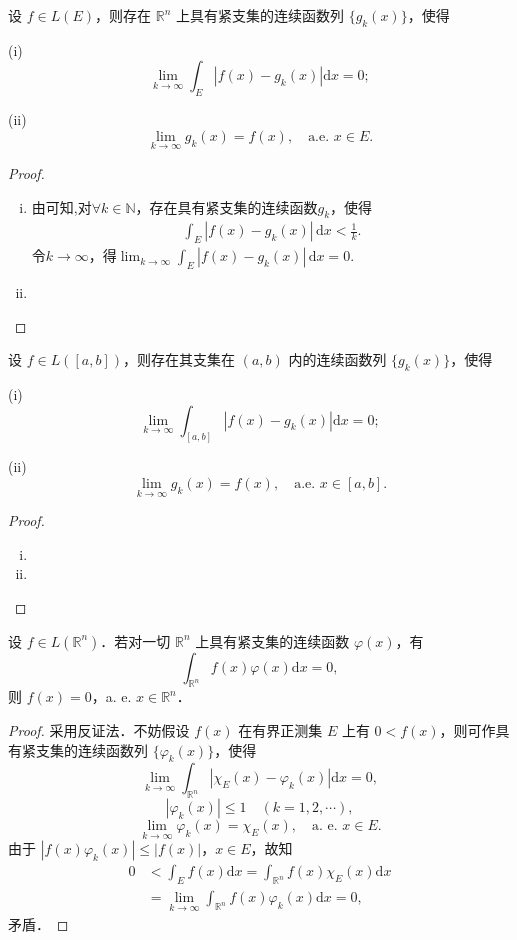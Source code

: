 \documentclass[../../main.tex]{subfiles}
\begin{document}
\begin{corollary}
设 \( f \in L(E) \)，则存在 \( \mathbb{R}^n \) 上具有紧支集的连续函数列 \( \{ g_k(x) \} \)，使得

(i)
\[
\lim_{k \to \infty} \int_E |f(x) - g_k(x)| \mathrm{d}x = 0;
\]

(ii)
\[
\lim_{k \to \infty} g_k(x) = f(x), \quad \text{a.e. } x \in E.
\]
\end{corollary}
\begin{proof}
\begin{enumerate}[(i)]
\item 由可知,对\(\forall k \in \mathbb{N}\)，存在具有紧支集的连续函数\(g_k\)，使得
\begin{align*}
\int_E \left| f(x) - g_k(x) \right| \, \mathrm{d}x < \frac{1}{k}.
\end{align*}
令\(k \to \infty\)，得\(\lim_{k \to \infty} \int_E \left| f(x) - g_k(x) \right| \, \mathrm{d}x = 0\).

\item 
\end{enumerate}
\end{proof}

\begin{corollary}
设 \( f \in L([a,b]) \)，则存在其支集在 \( (a,b) \) 内的连续函数列 \( \{ g_k(x) \} \)，使得

(i)
\[
\lim_{k \to \infty} \int_{[a,b]} |f(x) - g_k(x)| \mathrm{d}x = 0;
\]

(ii)
\[
\lim_{k \to \infty} g_k(x) = f(x), \quad \text{a.e. } x \in [a,b].
\]
\end{corollary}
\begin{proof}
\begin{enumerate}[(i)]
\item 

\item 
\end{enumerate}
\end{proof}

\begin{example}
设 \( f \in L(\mathbb{R}^n) \)．若对一切 \( \mathbb{R}^n \) 上具有紧支集的连续函数 \( \varphi(x) \)，有
\[
\int_{\mathbb{R}^n} f(x)\varphi(x) \mathrm{d}x = 0,
\]
则 \( f(x) = 0 \)，a. e. \( x \in \mathbb{R}^n \)．
\end{example}
\begin{proof}
采用反证法．不妨假设 \( f(x) \) 在有界正测集 \( E \) 上有 \( 0 < f(x) \)，则可作具有紧支集的连续函数列 \( \{ \varphi_k(x) \} \)，使得
\[
\lim_{k \to \infty} \int_{\mathbb{R}^n} |\chi_E(x) - \varphi_k(x)| \mathrm{d}x = 0,
\]
\[
|\varphi_k(x)| \leqslant 1 \quad (k = 1,2,\cdots),
\]
\[
\lim_{k \to \infty} \varphi_k(x) = \chi_E(x), \quad \text{a. e. } x \in E.
\]
由于 \( |f(x)\varphi_k(x)| \leqslant |f(x)| \)，\( x \in E \)，故知
\begin{align*}
0 &< \int_E f(x) \mathrm{d}x = \int_{\mathbb{R}^n} f(x)\chi_E(x) \mathrm{d}x \\
&= \lim_{k \to \infty} \int_{\mathbb{R}^n} f(x)\varphi_k(x) \mathrm{d}x = 0,
\end{align*}
矛盾．
\end{proof}
\end{document}
